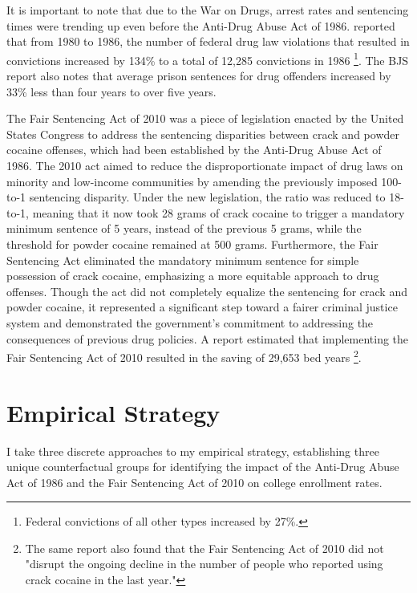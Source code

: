 \documentclass{article}
\begin{document}
It is important to note that due to the War on Drugs, arrest rates and sentencing times were trending up even before the Anti-Drug Abuse Act of 1986. \cite{bjs_1986} reported that from 1980 to 1986, the number of federal drug law violations that resulted in convictions increased by 134\% to a total of 12,285 convictions in 1986 \footnote{Federal convictions of all other types increased by 27\%.}. The BJS report also notes that average prison sentences for drug offenders increased by 33\% less than four years to over five years.

The Fair Sentencing Act of 2010 was a piece of legislation enacted by the United States Congress to address the sentencing disparities between crack and powder cocaine offenses, which had been established by the Anti-Drug Abuse Act of 1986. The 2010 act aimed to reduce the disproportionate impact of drug laws on minority and low-income communities by amending the previously imposed 100-to-1 sentencing disparity. Under the new legislation, the ratio was reduced to 18-to-1, meaning that it now took 28 grams of crack cocaine to trigger a mandatory minimum sentence of 5 years, instead of the previous 5 grams, while the threshold for powder cocaine remained at 500 grams. Furthermore, the Fair Sentencing Act eliminated the mandatory minimum sentence for simple possession of crack cocaine, emphasizing a more equitable approach to drug offenses. Though the act did not completely equalize the sentencing for crack and powder cocaine, it represented a significant step toward a fairer criminal justice system and demonstrated the government's commitment to addressing the consequences of previous drug policies. A \cite{ussc} report estimated that implementing the Fair Sentencing Act of 2010 resulted in the saving of 29,653 bed years \footnote{The same \cite{ussc} report also found that the Fair Sentencing Act of 2010 did not "disrupt the ongoing decline in the number of people who reported using crack cocaine in the last year."}. 


\section{Empirical Strategy}

I take three discrete approaches to my empirical strategy, establishing three unique counterfactual groups for identifying the impact of the Anti-Drug Abuse Act of 1986 and the Fair Sentencing Act of 2010 on college enrollment rates. 
\end{document}
